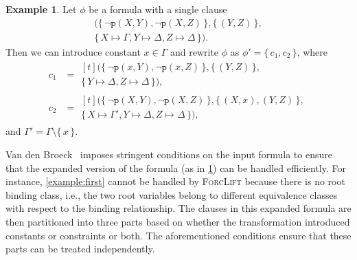 \documentclass{article}
\theoremstyle{definition}
\newtheorem{example}{Example}
\theoremstyle{remark}
\begin{document}
\begin{example}\label{example:dr}
  Let $\phi$ be a formula with a single clause
  \begin{multline*}
    (\{\, \neg \texttt{p}(X, Y), \neg \texttt{p}(X, Z) \,\}, \{\, (Y, Z) \,\}, \\
    \{\, X \mapsto \Gamma, Y \mapsto \Delta, Z \mapsto \Delta \,\}).
  \end{multline*}
  Then we can introduce constant $x \in \Gamma$ and rewrite $\phi$ as
  $\phi' = \{\, c_{1}, c_{2} \,\}$, where
  \begin{align*}
    c_{1} &= \begin{multlined}[t]
      (\{\, \neg \texttt{p}(x, Y), \neg \texttt{p}(x, Z) \,\}, \{\, (Y, Z) \,\}, \\
      \{\, Y \mapsto \Delta, Z \mapsto \Delta \,\}),
      \end{multlined}\\
    c_{2} &= \begin{multlined}[t]
      (\{\, \neg \texttt{p}(X, Y), \neg \texttt{p}(X, Z) \,\}, \{\, (X, x), (Y, Z) \,\}, \\
      \{\, X \mapsto \Gamma', Y \mapsto \Delta, Z \mapsto \Delta \,\}),
      \end{multlined}
  \end{align*}
  and $\Gamma' = \Gamma \setminus \{\, x \,\}$.
\end{example}

Van den Broeck~ imposes stringent conditions
on the input formula to ensure that the expanded version of the formula (as in
\cref{example:dr}) can be handled efficiently. For instance,
\cref{example:first} cannot be handled by \textsc{ForcLift} because there is no
root binding class, i.e., the two root variables belong to different equivalence
classes with respect to the binding relationship. The clauses in this expanded
formula are then partitioned into three parts based on whether the
transformation introduced constants or constraints or both. The aforementioned
conditions ensure that these parts can be treated independently.
\end{document}
